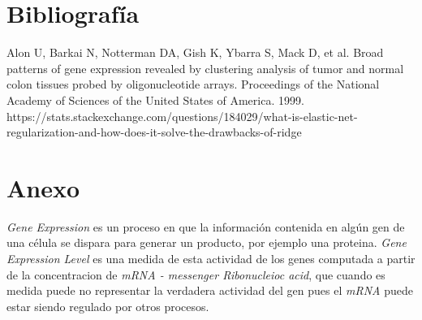 \documentclass[a4paper]{article}\usepackage[]{graphicx}\usepackage[]{color}
\newcommand*{\torange}{\textcolor{BurntOrange}}
\begin{document}
\clearpage
\section{Bibliografía}
\begin{enumerate}
 Alon U, Barkai N, Notterman DA, Gish K, Ybarra S, Mack D, et al. Broad patterns of gene expression revealed by clustering analysis of tumor and normal colon tissues probed by oligonucleotide arrays. Proceedings of the National Academy of Sciences of the United States of America. 1999.
https://stats.stackexchange.com/questions/184029/what-is-elastic-net-regularization-and-how-does-it-solve-the-drawbacks-of-ridge
\end{enumerate}


\section{Anexo}

\torange{\textit{Gene Expression}} es un proceso en que la información contenida en algún gen de una célula se dispara para generar un producto, por ejemplo una proteina. \torange{\textit{Gene Expression Level}} es una medida de esta actividad de los genes computada a partir de la concentracion de \textit{mRNA - messenger Ribonucleioc acid}, que cuando es medida puede no representar la verdadera actividad del gen pues el \textit{mRNA} puede estar siendo regulado por otros procesos.
\end{document}
